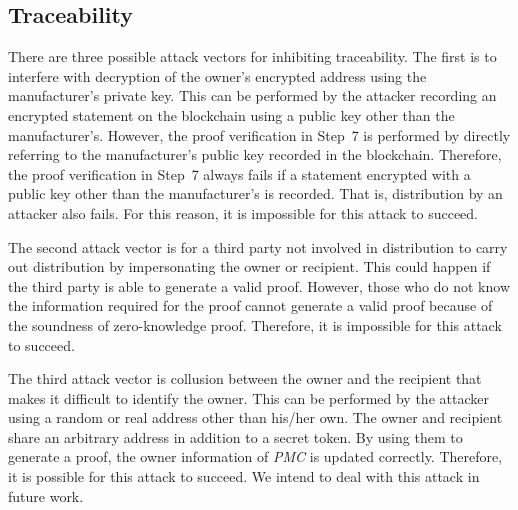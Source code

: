 \documentclass[conference]{IEEEtran}
\begin{document}
\subsection{Traceability}
There are three possible attack vectors for inhibiting traceability.
The first is to interfere with decryption of the owner's encrypted address using the manufacturer's private key.
This can be performed by the attacker recording an encrypted statement on the blockchain using a public key other than the manufacturer's.
However, the proof verification in Step~7 is performed by directly referring to the manufacturer's public key recorded in the blockchain.
Therefore, the proof verification in Step~7 always fails if a statement encrypted with a public key other than the manufacturer's is recorded.
That is, distribution by an attacker also fails.
For this reason, it is impossible for this attack to succeed.

The second attack vector is for a third party not involved in distribution to carry out %
distribution by impersonating the owner or recipient.
This could happen if the third party is able to generate a valid proof.
However, those who do not know the information required for the proof cannot generate a valid proof because of the soundness of zero-knowledge proof.
Therefore, it is impossible for this attack to succeed.

The third attack vector is collusion between the owner and the recipient that makes it difficult to identify the owner.
This can be performed by the attacker using a random or real address other than his/her own.
The owner and recipient share an arbitrary address in addition to a secret token.
By using them to generate a proof, the owner information of \textit{PMC} is updated correctly. 
Therefore, it is possible for this attack to succeed.
We intend to deal with this attack in future work.
\end{document}
